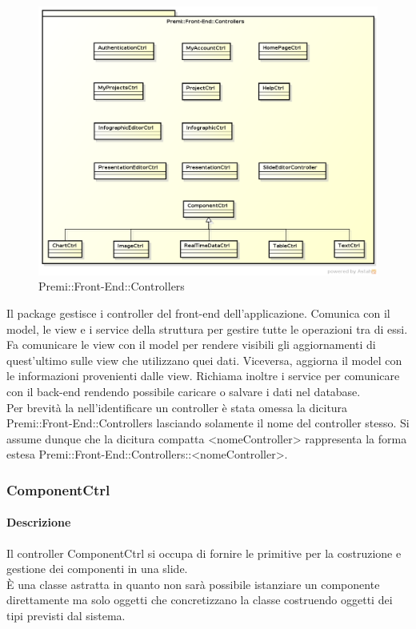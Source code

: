 \begin{figure}[h]
	\centering
	\includegraphics[width=1.0\linewidth]{img/premi_front_end_controllers}
	\caption[Premi::Front-End::Controllers]{Premi::Front-End::Controllers}
\end{figure}
Il package gestisce i controller del front-end dell'applicazione. Comunica con il model, le view e i service della struttura per gestire tutte le operazioni tra di essi. Fa comunicare le view con il model per rendere visibili gli aggiornamenti di quest'ultimo sulle view che utilizzano quei dati. Viceversa, aggiorna il model con le informazioni provenienti dalle view. Richiama inoltre i service per comunicare con il back-end rendendo possibile caricare o salvare i dati nel database.\\
Per brevità la nell'identificare un controller è stata omessa la dicitura Premi::Front-End::Controllers lasciando solamente il nome del controller stesso. Si assume dunque che la dicitura compatta <nomeController> rappresenta la forma estesa Premi::Front-End::Controllers::<nomeController>.

\newpage

\subsubsection{ComponentCtrl}
      \paragraph{Descrizione}
	Il controller ComponentCtrl si occupa di fornire le primitive per la costruzione e gestione dei componenti in una slide.\\
	È una classe astratta in quanto non sarà possibile istanziare un componente direttamente ma solo oggetti che concretizzano la classe costruendo oggetti dei tipi previsti dal sistema.\\
		
